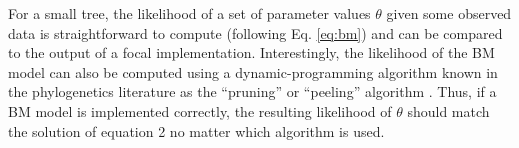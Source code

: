 \documentclass[oneside]{article}
\begin{document}
\begin{tcolorbox}[breakable, width=\textwidth, colback=gray!10, boxrule=0pt,
  title=Box 1: Models with well-known parametric \emph{pdf}'s, fonttitle=\bfseries]
For a small tree, the likelihood of a set
of parameter values $\theta$ given some observed data is
straightforward to compute (following Eq. \ref{eq:bm}) and can be compared to
the output of a focal implementation.
Interestingly, the likelihood of the BM model can also be computed using a
dynamic-programming algorithm known in the phylogenetics literature
as the ``pruning'' or ``peeling'' algorithm \citep{felsenstein73}.
Thus, if a BM model is implemented correctly, the resulting likelihood
of $\theta$ should match the solution of equation 2 no matter
which algorithm is used.

\end{tcolorbox}



\end{document}
